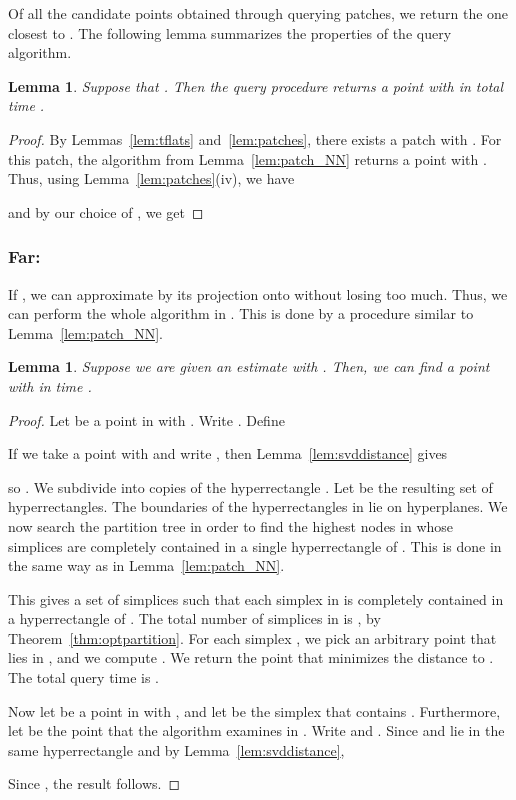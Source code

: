 \documentclass[a4paper,11pt]{paper}
\newtheorem{lemma}[theorem]{Lemma}
\begin{document}
\noindent
Of all the candidate points obtained through querying
patches, we return the one closest to .
The following lemma summarizes the properties of the
query algorithm.
\begin{lemma}\label{lem:nearQuery}
  Suppose that .
  Then the query procedure returns
  a point  with
   in
  total time
  .
\end{lemma}
\begin{proof}
  By Lemmas~\ref{lem:tflats} and~\ref{lem:patches},
  there exists a patch  with .
  For this patch, the algorithm from Lemma~\ref{lem:patch_NN}
  returns a point  with
  .
  Thus, using Lemma~\ref{lem:patches}(iv), we have
  
  and
  by our choice of , we get
    
\end{proof}

\subsubsection{Far: }\label{sec:far}

If , we can approximate  by its
projection  onto  without losing too much.
Thus, we can perform the whole algorithm in .
This is done by a procedure similar to Lemma~\ref{lem:patch_NN}.

\begin{lemma}\label{lem:farNNinQa}
  Suppose we are given an estimate 
  with .
  Then, we can find a point  with
   in
  time .
\end{lemma}
\begin{proof}
Let  be a point in  with
. Write .
Define

If we take a point  with
 and write
, then Lemma~\ref{lem:svddistance} gives

so  .
We subdivide  into copies of the
hyperrectangle
.
Let  be the resulting set of hyperrectangles.
The boundaries of the hyperrectangles in  lie on
 hyperplanes.
We now search the partition tree 
in order to find the highest nodes  in
  whose simplices  are completely contained
in a single hyperrectangle of .
This is done in the same way as in Lemma~\ref{lem:patch_NN}.

This gives a set  of simplices
such that each simplex in  is completely contained in
a hyperrectangle of .
The total number of simplices
in  is , by
Theorem~\ref{thm:optpartition}.
For each simplex ,
we pick an arbitrary point  that lies in
, and we compute . We return
the point  that minimizes the
distance to .
The total query time is .

Now let  be a point in  with ,
and let  be the simplex  that contains .
Furthermore, let  be the point that the algorithm
examines in . Write  and
. Since
 and  lie in the same hyperrectangle and by
Lemma~\ref{lem:svddistance},
  
Since , the result
follows.
\end{proof}
\end{document}
